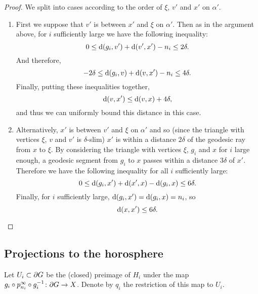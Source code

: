 \documentclass[a4paper]{article}
\begin{document}
\begin{proof}
  We split into cases according to the order of $\xi$, $v'$ and $x'$ on
  $\alpha'$.
  \begin{enumerate}
    \item
      First we suppose that $v'$ is between $x'$ and $\xi$ on $\alpha'$. Then as
      in the argument above, for $i$ sufficiently large we have the following
      inequality:
      \begin{equation*}
        0 \leq \operatorname{d}(g_i, v') + \operatorname{d}(v', x') - n_i \leq 2\delta.
      \end{equation*}
      And therefore,
      \begin{equation*}
        -2\delta \leq \operatorname{d}(g_i, v) + \operatorname{d}(v, x') - n_i \leq 4\delta.
      \end{equation*}
      Finally, putting these inequalities together,
      \begin{equation*}
        \operatorname{d}(v,x') \leq \operatorname{d}(v,x) + 4\delta,
      \end{equation*}
      and thus we can uniformly bound this distance in this case.
    \item
      Alternatively, $x'$ is between $v'$ and $\xi$ on $\alpha'$ and so (since
      the triangle with vertices $\xi$, $v$ and $v'$ is $\delta$-slim) $x'$ is
      within a distance $2\delta$ of the geodesic ray from $x$ to $\xi$. By
      considering the triangle with vertices $\xi$, $g_i$ and $x$ for $i$ large
      enough, a geodesic segment from $g_i$ to $x$ passes within a distance
      $3\delta$ of $x'$. Therefore we have the following inequality for all $i$
      sufficiently large:
      \begin{equation*}
        0 \leq \operatorname{d}(g_i, x') + \operatorname{d}(x', x) - \operatorname{d}(g_i, x) \leq 6\delta.
      \end{equation*}
      Finally, for $i$ sufficiently large, $\operatorname{d}(g_i, x') = \operatorname{d}(g_i, x) = n_i$,
      so
      \begin{equation*}
        \operatorname{d}(x,x') \leq 6\delta.
      \end{equation*}
  \end{enumerate}
\end{proof}

\subsection{Projections to the horosphere}

\begin{definition}
  Let $U_i \subset \partial G$ be the (closed) preimage of $H_i$ under the map 
  $g_i \circ p^\infty_{n_i} \circ g_i^{-1} \colon \partial G \to X$.
  Denote by $q_i$ the restriction of this map to $U_i$.
\end{definition}
\end{document}
